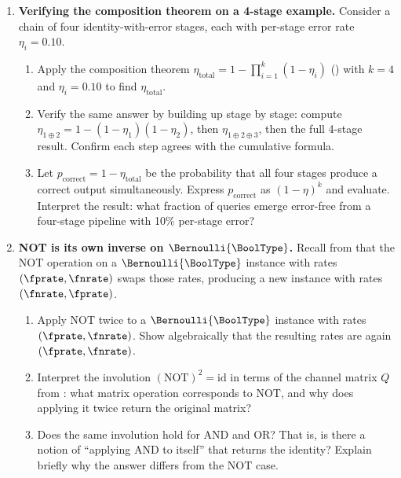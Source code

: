 \begin{enumerate}

\item \exstarstar
\textbf{Verifying the composition theorem on a 4-stage example.}
Consider a chain of four identity-with-error stages, each with per-stage
error rate $\eta_i = 0.10$.
\begin{enumerate}
  \item[(a)] Apply the composition theorem $\eta_{\mathrm{total}}
    = 1 - \prod_{i=1}^{k}(1 - \eta_i)$ ()
    with $k = 4$ and $\eta_i = 0.10$ to find $\eta_{\mathrm{total}}$.
  \item[(b)] Verify the same answer by building up stage by stage: compute
    $\eta_{1\oplus 2} = 1 - (1-\eta_1)(1-\eta_2)$, then
    $\eta_{1\oplus 2 \oplus 3}$, then the full 4-stage result.
    Confirm each step agrees with the cumulative formula.
  \item[(c)] Let $p_{\mathrm{correct}} = 1 - \eta_{\mathrm{total}}$ be the
    probability that all four stages produce a correct output simultaneously.
    Express $p_{\mathrm{correct}}$ as $(1 - \eta)^k$ and evaluate.
    Interpret the result: what fraction of queries emerge error-free from
    a four-stage pipeline with 10\% per-stage error?
\end{enumerate}

\item \exstarstar
\textbf{NOT is its own inverse on $\Bernoulli{\BoolType}$.}
Recall from  that the NOT operation on a
$\Bernoulli{\BoolType}$ instance with rates $(\fprate, \fnrate)$ swaps
those rates, producing a new instance with rates $(\fnrate, \fprate)$.
\begin{enumerate}
  \item[(a)] Apply NOT twice to a $\Bernoulli{\BoolType}$ instance with
    rates $(\fprate, \fnrate)$. Show algebraically that the resulting
    rates are again $(\fprate, \fnrate)$.
  \item[(b)] Interpret the involution $(\mathrm{NOT})^2 = \mathrm{id}$ in
    terms of the channel matrix $Q$ from : what
    matrix operation corresponds to NOT, and why does applying it twice
    return the original matrix?
  \item[(c)] Does the same involution hold for AND and OR? That is, is
    there a notion of ``applying AND to itself'' that returns the identity?
    Explain briefly why the answer differs from the NOT case.
\end{enumerate}


\end{enumerate}
